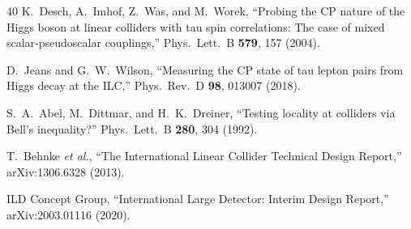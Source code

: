 \documentclass[prl,twocolumn,superscriptaddress,floatfix]{revtex4-2}
\begin{document}
\begin{thebibliography}{40}
  K.~Desch, A.~Imhof, Z.~Was, and M.~Worek,
  ``Probing the CP nature of the Higgs boson at linear colliders
  with tau spin correlations: The case of mixed scalar-pseudoscalar
  couplings,''
  Phys.\ Lett.\ B \textbf{579}, 157 (2004).

  D.~Jeans and G.~W.~Wilson,
  ``Measuring the CP state of tau lepton pairs from Higgs decay
  at the ILC,''
  Phys.\ Rev.\ D \textbf{98}, 013007 (2018).

  S.~A.~Abel, M.~Dittmar, and H.~K.~Dreiner,
  ``Testing locality at colliders via Bell's inequality?''
  Phys.\ Lett.\ B \textbf{280}, 304 (1992).

  T.~Behnke \textit{et al.},
  ``The International Linear Collider Technical Design Report,''
  arXiv:1306.6328 (2013).

  ILD Concept Group,
  ``International Large Detector: Interim Design Report,''
  arXiv:2003.01116 (2020).

\end{thebibliography}
\end{document}
